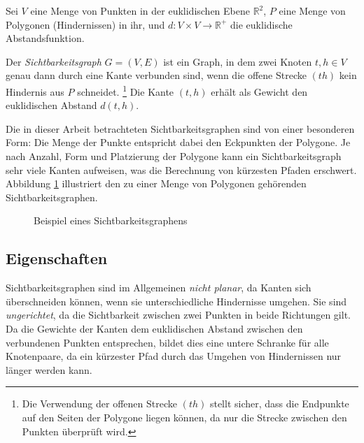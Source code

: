 \begin{definition}[Sichtbarkeitsgraph]
    Sei $V$ eine Menge von Punkten in der euklidischen Ebene $\mathbb{R}^2$, $P$ eine Menge von Polygonen (Hindernissen) in ihr, und $d \colon V \times V \to \mathbb{R}^+$ die euklidische Abstandsfunktion.

    Der \emph{Sichtbarkeitsgraph} $G = (V, E)$ ist ein Graph, in dem zwei Knoten $t, h \in V$ genau dann durch eine Kante verbunden sind, wenn die offene Strecke $(th)$ kein Hindernis aus $P$ schneidet.%
    \footnote{
        Die Verwendung der offenen Strecke $(th)$ stellt sicher, dass die Endpunkte auf den Seiten der Polygone liegen können, da nur die Strecke zwischen den Punkten überprüft wird.
    }
    Die Kante $(t, h)$ erhält als Gewicht den euklidischen Abstand $d(t, h)$.
\end{definition}

Die in dieser Arbeit betrachteten Sichtbarkeitsgraphen sind von einer besonderen Form:
Die Menge der Punkte entspricht dabei den Eckpunkten der Polygone.
Je nach Anzahl, Form und Platzierung der Polygone kann ein Sichtbarkeitsgraph sehr viele Kanten aufweisen, was die Berechnung von kürzesten Pfaden erschwert.
Abbildung \ref{graph:fig:vis_example} illustriert den zu einer Menge von Polygonen gehörenden Sichtbarkeitsgraphen.

\begin{figure}[ht]
    \centering
    \caption{Beispiel eines Sichtbarkeitsgraphens}
    \label{graph:fig:vis_example}
\end{figure}

\subsection{Eigenschaften}

Sichtbarkeitsgraphen sind im Allgemeinen \emph{nicht planar}, da Kanten sich überschneiden können, wenn sie unterschiedliche Hindernisse umgehen.
Sie sind \emph{ungerichtet}, da die Sichtbarkeit zwischen zwei Punkten in beide Richtungen gilt.
Da die Gewichte der Kanten dem euklidischen Abstand zwischen den verbundenen Punkten entsprechen, bildet dies eine untere Schranke für alle Knotenpaare, da ein kürzester Pfad durch das Umgehen von Hindernissen nur länger werden kann.

